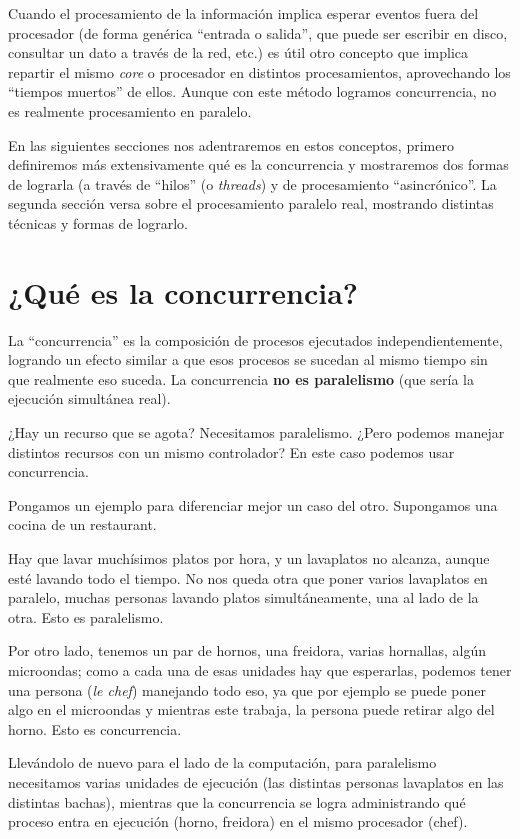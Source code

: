 Cuando el procesamiento de la información implica esperar eventos fuera del procesador (de forma genérica ``entrada o salida'', que puede ser escribir en disco, consultar un dato a través de la red, etc.) es útil otro concepto que implica repartir el mismo \textit{core} o procesador en distintos procesamientos, aprovechando los ``tiempos muertos'' de ellos. Aunque con este método logramos concurrencia, no es realmente procesamiento en paralelo.

En las siguientes secciones nos adentraremos en estos conceptos, primero definiremos más extensivamente qué es la concurrencia y mostraremos dos formas de lograrla (a través de ``hilos'' (o \textit{threads}) y de procesamiento ``asincrónico''. La segunda sección versa sobre el procesamiento paralelo real, mostrando distintas técnicas y formas de lograrlo.


\section{¿Qué es la concurrencia?}\label{sec:concurrencia}

La ``concurrencia'' es la composición de procesos ejecutados independientemente, logrando un efecto similar a que esos procesos se sucedan al mismo tiempo sin que realmente eso suceda. La concurrencia \textbf{no es paralelismo} (que sería la ejecución simultánea real).

¿Hay un recurso que se agota? Necesitamos paralelismo. ¿Pero podemos manejar distintos recursos con un mismo controlador? En este caso podemos usar concurrencia.

Pongamos un ejemplo para diferenciar mejor un caso del otro. Supongamos una cocina de un restaurant.

Hay que lavar muchísimos platos por hora, y un lavaplatos no alcanza, aunque esté lavando todo el tiempo. No nos queda otra que poner varios lavaplatos en paralelo, muchas personas lavando platos simultáneamente, una al lado de la otra. Esto es paralelismo.

Por otro lado, tenemos un par de hornos, una freidora, varias hornallas, algún microondas; como a cada una de esas unidades hay que esperarlas, podemos tener una persona (\textit{le chef}) manejando todo eso, ya que por ejemplo se puede poner algo en el microondas y mientras este trabaja, la persona puede retirar algo del horno. Esto es concurrencia.

Llevándolo de nuevo para el lado de la computación, para paralelismo necesitamos varias unidades de ejecución (las distintas personas lavaplatos en las distintas bachas), mientras que la concurrencia se logra administrando qué proceso entra en ejecución (horno, freidora) en el mismo procesador (chef).


